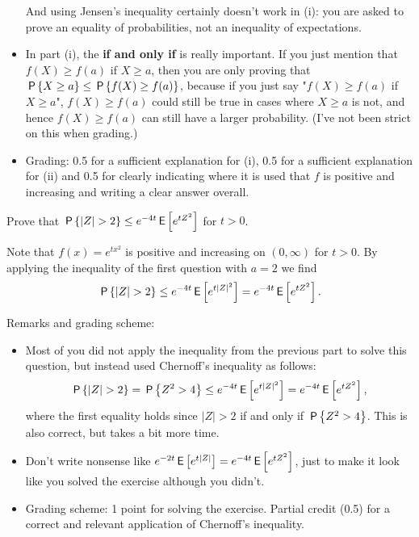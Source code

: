 \begin{exercise}[1.5]
\begin{solution}
\begin{itemize}
And using Jensen's inequality certainly doesn't work in (i): you are asked to prove an equality of probabilities, not an inequality of expectations. 
\item In part (i), the \textbf{if and only if} is really important. If you just mention that $f(X) \geq f(a)$ if $X \geq a$, then you are only proving that $\P{X \geq a} \leq \P{f(X) \geq f(a)}$, because if you just say "$f(X) \geq f(a)$ if $X \geq a$",  $f(X) \geq f(a)$ could still be true in cases where $X \geq a$ is not, and hence  $f(X) \geq f(a)$  can still have a larger probability. (I've not been strict on this when grading.)
\item Grading: 0.5 for a sufficient explanation for (i), 0.5 for a sufficient explanation for (ii) and 0.5 for clearly indicating where it is used that $f$ is positive and increasing and writing a clear answer overall. 
\end{itemize}
\end{solution}
\end{exercise}




\begin{exercise}[1]
Prove that $\P{|Z| > 2} \leq e^{-4t}\E{e^{t Z^2}}$ for $t>0$. \\
\begin{solution}
Note that $f(x) = e^{t x^2}$ is positive and increasing on $(0,\infty)$ for $t>0$. By applying the inequality of the first question with $a=2$ we find 
$$\P{|Z| > 2} \leq e^{-4t}\E{e^{t |Z|^2}} = e^{-4t}\E{e^{t Z^2}}.$$

\noindent Remarks and grading scheme:
\begin{itemize}
\item Most of you did not apply the inequality from the previous part to solve this question, but instead used Chernoff's inequality as follows:
$$\P{|Z| > 2} = \P{Z^2 > 4} \leq e^{-4t}\E{e^{t |Z|^2}} = e^{-4t}\E{e^{t Z^2}},$$
where the first equality holds since $|Z| > 2$ if and only if $\P{Z^2 > 4}$. This is also correct, but takes a bit more time. 
\item Don't write nonsense like $e^{-2t}\E{e^{t |Z|}} = e^{-4t}\E{e^{t Z^2}}$, just to make it look like you solved the exercise although you didn't. 
\item Grading scheme: 1 point for solving the exercise. Partial credit (0.5) for a correct and relevant application of Chernoff's inequality.
\end{itemize}
\end{solution}
\end{exercise}


